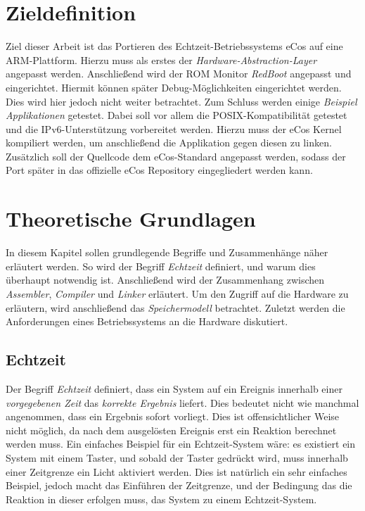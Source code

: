 \documentclass[
  a4paper,					%
  twoside,
  DIV=calc,     				%
  bibliography=totoc,
  cleardoublepage=empty,
  ngerman,     					%
  final       					%
]{scrbook}
\begin{document}
\chapter{Zieldefinition}
\label{sec:Zieldefinition}
Ziel dieser Arbeit ist das Portieren des Echtzeit-Betriebssystems eCos auf eine ARM-Plattform. Hierzu muss als erstes der \emph{Hardware-Abstraction-Layer} angepasst werden. Anschließend wird der ROM Monitor \emph{RedBoot} angepasst und eingerichtet. Hiermit können später Debug-Möglichkeiten eingerichtet werden. Dies wird hier jedoch nicht weiter betrachtet. Zum Schluss werden einige \emph{Beispiel Applikationen} getestet. Dabei soll vor allem die POSIX-Kompatibilität getestet und die IPv6-Unterstützung vorbereitet werden. Hierzu muss der eCos Kernel kompiliert werden, um anschließend die Applikation gegen diesen zu linken. Zusätzlich soll der Quellcode dem eCos-Standard angepasst werden, sodass der Port später in das offizielle eCos Repository eingegliedert werden kann.








\chapter{Theoretische Grundlagen}
\label{sec:Grundlagen}
In diesem Kapitel sollen grundlegende Begriffe und Zusammenhänge näher erläutert werden. So wird der Begriff \emph{Echtzeit} definiert, und warum dies überhaupt notwendig ist. Anschließend wird der Zusammenhang zwischen \emph{Assembler}, \emph{Compiler} und \emph{Linker} erläutert. Um den Zugriff auf die Hardware zu erläutern, wird anschließend das \emph{Speichermodell} betrachtet. Zuletzt werden die Anforderungen eines Betriebssystems an die Hardware diskutiert.


\section{Echtzeit}
\label{sec:Echtzeit}
Der Begriff \emph{Echtzeit} definiert, dass ein System auf ein Ereignis innerhalb einer \emph{vorgegebenen Zeit} das \emph{korrekte Ergebnis} liefert. Dies bedeutet nicht wie manchmal angenommen, dass ein Ergebnis sofort vorliegt. Dies ist offensichtlicher Weise nicht möglich, da nach dem ausgelösten Ereignis erst ein Reaktion berechnet werden muss. Ein einfaches Beispiel für ein Echtzeit-System wäre: es existiert ein System mit einem Taster, und sobald der Taster gedrückt wird, muss innerhalb einer Zeitgrenze ein Licht aktiviert werden. Dies ist natürlich ein sehr einfaches Beispiel, jedoch macht das Einführen der Zeitgrenze, und der Bedingung das die Reaktion in dieser erfolgen muss, das System zu einem Echtzeit-System.
\end{document}
